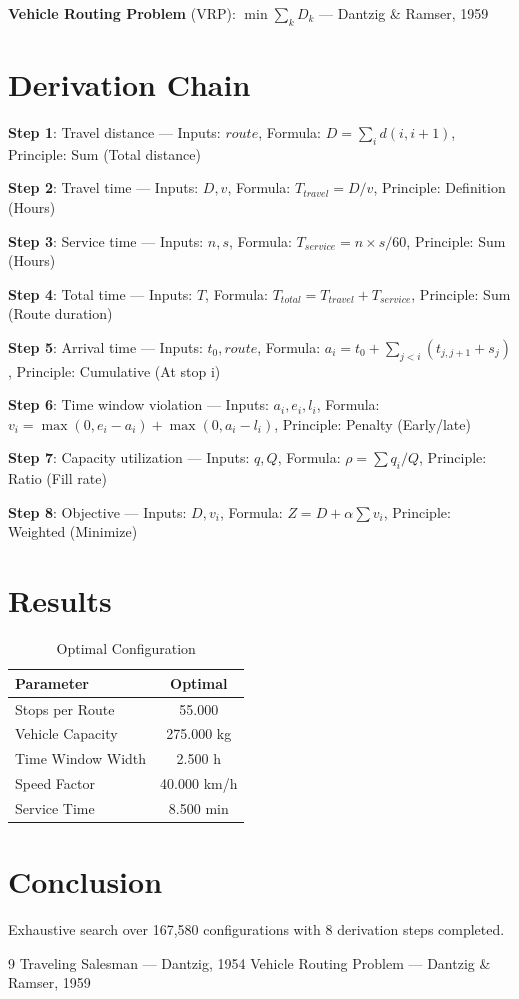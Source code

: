 \documentclass[11pt,twocolumn]{article}
\begin{document}
\textbf{Vehicle Routing Problem} (VRP): $\min \sum_k D_k$ --- Dantzig & Ramser, 1959


\section{Derivation Chain}
\textbf{Step 1}: Travel distance --- Inputs: $route$, Formula: $D = \sum_{i} d(i, i+1)$, Principle: Sum (Total distance)


\textbf{Step 2}: Travel time --- Inputs: $D, v$, Formula: $T_{travel} = D/v$, Principle: Definition (Hours)


\textbf{Step 3}: Service time --- Inputs: $n, s$, Formula: $T_{service} = n \times s/60$, Principle: Sum (Hours)


\textbf{Step 4}: Total time --- Inputs: $T$, Formula: $T_{total} = T_{travel} + T_{service}$, Principle: Sum (Route duration)


\textbf{Step 5}: Arrival time --- Inputs: $t_0, route$, Formula: $a_i = t_0 + \sum_{j<i}(t_{j,j+1} + s_j)$, Principle: Cumulative (At stop i)


\textbf{Step 6}: Time window violation --- Inputs: $a_i, e_i, l_i$, Formula: $v_i = \max(0, e_i - a_i) + \max(0, a_i - l_i)$, Principle: Penalty (Early/late)


\textbf{Step 7}: Capacity utilization --- Inputs: $q, Q$, Formula: $\rho = \sum q_i / Q$, Principle: Ratio (Fill rate)


\textbf{Step 8}: Objective --- Inputs: $D, v_i$, Formula: $Z = D + \alpha \sum v_i$, Principle: Weighted (Minimize)


\section{Results}
\begin{table}[h]
\centering
\caption{Optimal Configuration}
\begin{tabular}{@{}lc@{}}
\toprule
Parameter & Optimal \\
\midrule
Stops per Route & 55.000  \\
Vehicle Capacity & 275.000 kg \\
Time Window Width & 2.500 h \\
Speed Factor & 40.000 km/h \\
Service Time & 8.500 min \\
\bottomrule
\end{tabular}
\end{table}

\section{Conclusion}
Exhaustive search over 167,580 configurations with 8 derivation steps completed.

\begin{thebibliography}{9}
 Traveling Salesman --- Dantzig, 1954
 Vehicle Routing Problem --- Dantzig & Ramser, 1959
\end{thebibliography}
\end{document}
